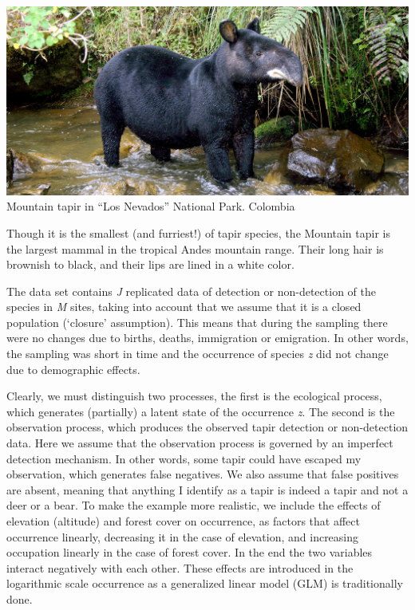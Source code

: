 \documentclass[
]{book}
\begin{document}
\includegraphics{images/Mountain_Tapir_large.jpg}
Mountain tapir in ``Los Nevados'' National Park. Colombia

Though it is the smallest (and furriest!) of tapir species, the Mountain tapir is the largest mammal in the tropical Andes mountain range. Their long hair is brownish to black, and their lips are lined in a white color.

The data set contains \emph{J} replicated data of detection or non-detection of the species in \emph{M} sites, taking into account that we assume that it is a closed population (`closure' assumption). This means that during the sampling there were no changes due to births, deaths, immigration or emigration. In other words, the sampling was short in time and the occurrence of species \emph{z} did not change due to demographic effects.

Clearly, we must distinguish two processes, the first is the ecological process, which generates (partially) a latent state of the occurrence \emph{z}. The second is the observation process, which produces the observed tapir detection or non-detection data. Here we assume that the observation process is governed by an imperfect detection mechanism. In other words, some tapir could have escaped my observation, which generates false negatives. We also assume that false positives are absent, meaning that anything I identify as a tapir is indeed a tapir and not a deer or a bear. To make the example more realistic, we include the effects of elevation (altitude) and forest cover on occurrence, as factors that affect occurrence linearly, decreasing it in the case of elevation, and increasing occupation linearly in the case of forest cover. In the end the two variables interact negatively with each other. These effects are introduced in the logarithmic scale occurrence as a generalized linear model (GLM) is traditionally done.
\end{document}
